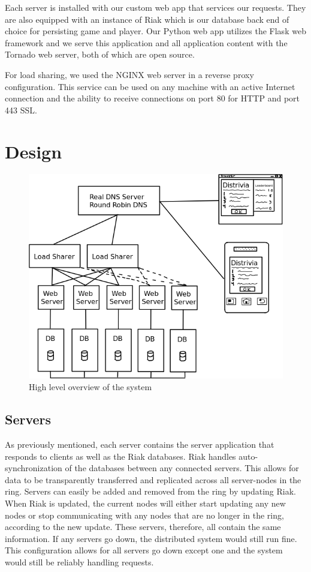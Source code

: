 \documentclass{dependencies/acm_proc_article-sp}
\begin{document}
Each server is installed with our custom web app that services our requests.
They are  also equipped with an instance of Riak \cite{riak} which is our database back end of choice for persisting game and player. Our Python web app utilizes the Flask \cite{flask} web framework and we serve this application and all application content with the Tornado \cite{tornado} web server, both of which are open source.

For load sharing, we used the NGINX \cite{nginx} web server in a reverse proxy configuration. This service can be used on any machine with an active Internet connection and the ability to receive connections on port 80 for HTTP and port 443 SSL. 


\section{Design}
\begin{figure}[h!]
  \centering
	\includegraphics[scale=0.4]{diagram.png}
   \caption{High level overview of the system}
 \end{figure}
\subsection{Servers}
As previously mentioned, each server contains the server application that responds to clients as well as the Riak databases.
Riak handles auto-synchronization of the databases between any connected servers.
This allows for data to be transparently transferred and replicated across all server-nodes in the ring.
Servers can easily be added and removed from the ring by updating Riak.
When Riak is updated, the current nodes will either start updating any new nodes or stop communicating with any nodes that are no longer in the ring, according to the new update.
These servers, therefore, all contain the same information.
If any servers go down, the distributed system would still run fine.
This configuration allows for all servers go down except one and the system would still be reliably handling requests.
\end{document}
